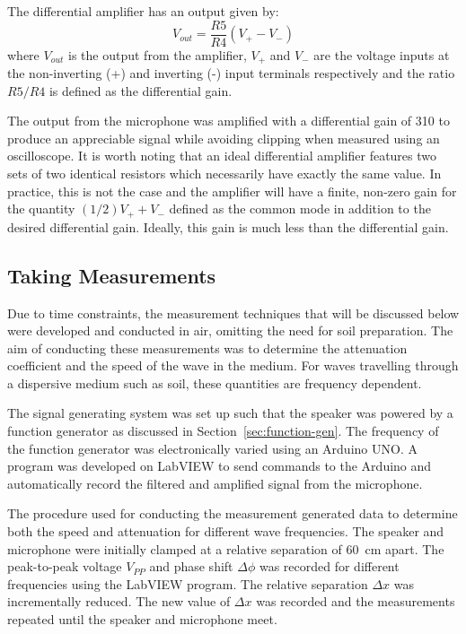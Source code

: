 \documentclass[twocolumn]{article}
\begin{document}
The differential amplifier has an output given by:
\begin{equation*}
    V_{out} = \frac{R5}{R4}(V_+ - V_-)
\end{equation*}
where $V_{out}$ is the output from the amplifier, $V_+$ and $V_-$ are the voltage inputs at the non-inverting (+) and inverting (-) input terminals respectively and the ratio $R5/R4$ is defined as the differential gain.

The output from the microphone was amplified with a differential gain of 310 to produce an appreciable signal while avoiding clipping when measured using an oscilloscope. It is worth noting that an ideal differential amplifier features two sets of two identical resistors which necessarily have exactly the same value. In practice, this is not the case and the amplifier will have a finite, non-zero gain for the quantity $(1/2)V_+ + V_-$ defined as the common mode in addition to the desired differential gain. Ideally, this gain is much less than the differential gain.

\subsection{Taking Measurements} \label{sec:data-acquisition}
Due to time constraints, the measurement techniques that will be discussed below were developed and conducted in air, omitting the need for soil preparation. The aim of conducting these measurements was to determine the attenuation coefficient and the speed of the wave in the medium. For waves travelling through a dispersive medium such as soil, these quantities are frequency dependent.

The signal generating system was set up such that the speaker was powered by a function generator as discussed in Section~\ref{sec:function-gen}. The frequency of the function generator was electronically varied using an Arduino UNO. A program was developed on LabVIEW to send commands to the Arduino and automatically record the filtered and amplified signal from the microphone.

The procedure used for conducting the measurement generated data to determine both the speed and attenuation for different wave frequencies. The speaker and microphone were initially clamped at a relative separation of \SI{60}{\cm} apart. The peak-to-peak voltage $V_{PP}$ and phase shift $\Delta\phi$ was recorded for different frequencies using the LabVIEW program. The relative separation $\Delta{x}$ was incrementally reduced. The new value of $\Delta{x}$ was recorded and the measurements repeated until the speaker and microphone meet.
\end{document}
